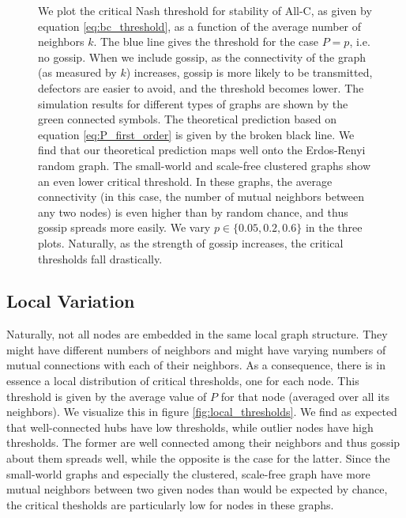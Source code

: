 \documentclass{article}
\renewcommand{\=}[1]{\stackrel{#1}{=}} %
\begin{document}
\begin{figure}
\noindent{}
\noindent{}
\caption{
We plot the critical Nash threshold for stability of All-C, as given by equation \ref{eq:bc_threshold}, as a function of the average number of neighbors $k$. The blue line gives the threshold for the case $P=p$, i.e. no gossip. When we include gossip, as the connectivity of the graph (as measured by $k$) increases, gossip is more likely to be transmitted, defectors are easier to avoid, and the threshold becomes lower. The simulation results for different types of graphs are shown by the green connected symbols. The theoretical prediction based on equation \ref{eq:P_first_order} is given by the broken black line. We find that our theoretical prediction maps well onto the Erdos-Renyi random graph. The small-world and scale-free clustered graphs show an even lower critical threshold. In these graphs, the average connectivity (in this case, the number of mutual neighbors between any two nodes) is even higher than by random chance, and thus gossip spreads more easily. We vary $p \in \{0.05,0.2,0.6\}$ in the three plots. Naturally, as the strength of gossip increases, the critical thresholds fall drastically.}

\label{fig:b_c_critical}
\end{figure}
 
\subsection{Local Variation}
Naturally, not all nodes are embedded in the same local graph structure. They might have different numbers of neighbors and might have varying numbers of mutual connections with each of their neighbors. As a consequence, there is in essence a local distribution of critical thresholds, one for each node. This threshold is given by the average value of $P$ for that node (averaged over all its neighbors). We visualize this in figure \ref{fig:local_thresholds}. We find as expected that well-connected hubs have low thresholds, while outlier nodes have high thresholds. The former are well connected among their neighbors and thus gossip about them spreads well, while the opposite is the case for the latter. Since the small-world graphs and especially the clustered, scale-free graph have more mutual neighbors between two given nodes than would be expected by chance, the critical thesholds are particularly low for nodes in these graphs.
\end{document}
